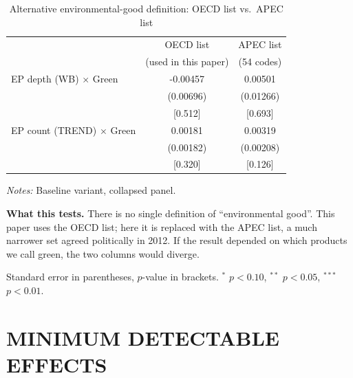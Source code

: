 \documentclass{article}
\begin{document}
\begin{table}[htbp]
\centering
\footnotesize
\caption{Alternative environmental-good definition: OECD list vs.\ APEC list}
\label{tab:apec}
\begin{threeparttable}
\begin{tabular}{lcc}
\toprule
 & OECD list & APEC list \\
 & (used in this paper) & (54 codes) \\
\midrule
EP depth (WB) $\times$ Green & -0.00457 & 0.00501 \\
 & (0.00696) & (0.01266) \\
 & [0.512] & [0.693] \\
\addlinespace
EP count (TREND) $\times$ Green & 0.00181 & 0.00319 \\
 & (0.00182) & (0.00208) \\
 & [0.320] & [0.126] \\
\bottomrule
\end{tabular}
\begin{tablenotes}[flushleft]\footnotesize
\item \emph{Notes:} Baseline variant, collapsed panel.
\item \textbf{What this tests.} There is no single definition of ``environmental good''. This paper uses the OECD list; here it is replaced with the APEC list, a much narrower set agreed politically in 2012. If the result depended on which products we call green, the two columns would diverge.
\item Standard error in parentheses, $p$-value in brackets. $^{*}$ $p<0.10$, $^{**}$ $p<0.05$, $^{***}$ $p<0.01$.
\end{tablenotes}
\end{threeparttable}
\end{table}


\newpage
\section{MINIMUM DETECTABLE EFFECTS}
\end{document}
